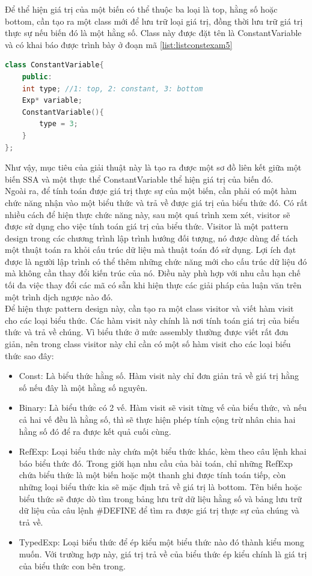 Để thể hiện giá trị của một biến có thể thuộc ba loại là top, hằng số hoặc bottom, cần tạo ra một class mới để lưu trữ loại giá trị, đồng thời lưu trữ giá trị thực sự nếu biến đó là một hằng số. Class này được đặt tên là ConstantVariable và có khai báo được trình bày ở đoạn mã \ref{list:listconstexam5}
\begin{lstlisting}[caption={Đoạn mã thể hiện class ConstantVariable},label={list:listconstexam5}, language=c++]
class ConstantVariable{
	public:
	int type; //1: top, 2: constant, 3: bottom
	Exp* variable;
	ConstantVariable(){
		type = 3;
	}
};
\end{lstlisting}
Như vậy, mục tiêu của giải thuật này là tạo ra được một sơ đồ liên kết giữa một biến SSA và một thực thể ConstantVariable thể hiện giá trị của biến đó. \\

Ngoài ra, để tính toán được giá trị thực sự của một biến, cần phải có một hàm chức năng nhận vào một biểu thức và trả về được giá trị của biểu thức đó. Có rất nhiều cách để hiện thực chức năng này, sau một quá trình xem xét, visitor sẽ được sử dụng cho việc tính toán giá trị của biểu thức. Visitor là một pattern design trong các chương trình lập trình hướng đối tượng, nó được dùng để tách một thuật toán ra khỏi cấu trúc dữ liệu mà thuật toán đó sử dụng. Lợi ích đạt được là người lập trình có thể thêm những chức năng mới cho cấu trúc dữ liệu đó mà không cần thay đổi kiến trúc của nó. Điều này phù hợp với nhu cầu hạn chế tối đa việc thay đổi các mã có sẵn khi hiện thực các giải pháp của luận văn trên một trình dịch ngược nào đó.\\

Để hiện thực pattern design này, cần tạo ra một class visitor và viết hàm visit cho các loại biểu thức. Các hàm visit này chính là nơi tính toán giá trị của biểu thức và trả về chúng. Vì biểu thức ở mức assembly thường được viết rất đơn giản, nên trong class visitor này chỉ cần có một số hàm visit cho các loại biểu thức sao đây:

\begin{itemize}
	\item Const: Là biểu thức hằng số. Hàm visit này chỉ đơn giản trả về giá trị hằng số nếu đây là một hằng số nguyên.
	\item Binary: Là biểu thức có 2 vế. Hàm visit sẽ visit từng vế của biểu thức, và nếu cả hai vế đều là hằng số, thì sẽ thực hiện phép tính cộng trừ nhân chia hai hằng số đó để ra được kết quả cuối cùng.
	\item RefExp: Loại biểu thức này chứa một biểu thức khác, kèm theo câu lệnh khai báo biểu thức đó. Trong giới hạn nhu cầu của bài toán, chỉ những RefExp chứa biểu thức là một biến hoặc một thanh ghi được tính toán tiếp, còn những loại biểu thức kia sẽ mặc định trả về giá trị là bottom. Tên biến hoặc biểu thức sẽ được dò tìm trong bảng lưu trữ dữ liệu hằng số và bảng lưu trữ dữ liệu của câu lệnh \#DEFINE để tìm ra được giá trị thực sự của chúng và trả về.
	\item TypedExp: Loại biểu thức để ép kiểu một biểu thức nào đó thành kiểu mong muốn. Với trường hợp này, giá trị trả về của biểu thức ép kiểu chính là giá trị của biểu thức con bên trong.
\end{itemize}


